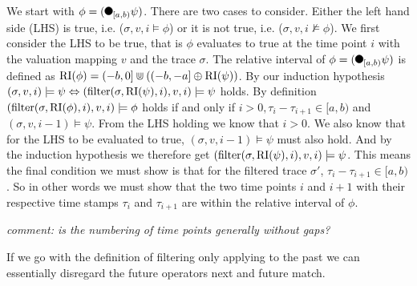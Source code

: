 We start with $\phi = (\Previous{[a,b)} \psi)$.
There are two cases to consider.
Either the left hand side (LHS) is true, i.e. ($\sigma, v, i \models \phi$) or it is not true, i.e. ($\sigma, v, i \not\models \phi$).
We first consider the LHS to be true, that is $\phi$ evaluates to true at the time point $i$ with the valuation mapping $v$ and the trace $\sigma$.
The relative interval of $\phi=(\Previous{[a,b)} \psi)$ is defined as $\operatorname{RI}(\phi) = (-b,0] \Cup ((-b,-a] \oplus \operatorname{RI}(\psi))$.
By our induction hypothesis $ (\sigma, v, i) \models \psi \Leftrightarrow (\operatorname{filter}(\sigma, \operatorname{RI}(\psi), i), v, i) \models \psi $ holds.
By definition $(\operatorname{filter}(\sigma, \operatorname{RI}(\phi), i), v, i) \models \phi$ holds if and only if $i > 0, \tau_i - \tau_{i+1} \in [a,b)$ and $(\sigma, v, i-1) \models \psi$.
From the LHS holding we know that $i>0$.
We also know that for the LHS to be evaluated to true, $(\sigma, v, i-1) \models \psi$ must also hold.
And by the induction hypothesis we therefore get $(\operatorname{filter}(\sigma, \operatorname{RI}(\psi), i), v, i) \models \psi$.
This means the final condition we must show is that for the filtered trace $\sigma'$, $\tau_i - \tau_{i+1} \in [a,b)$.
So in other words we must show that the two time points $i$ and $i+1$ with their respective time stamps $\tau_i$ and $\tau_{i+1}$ are within the relative interval of $\phi$.

\textit{comment: is the numbering of time points generally without gaps?}

If we go with the definition of filtering only applying to the past we can essentially disregard the future operators next and future match.





